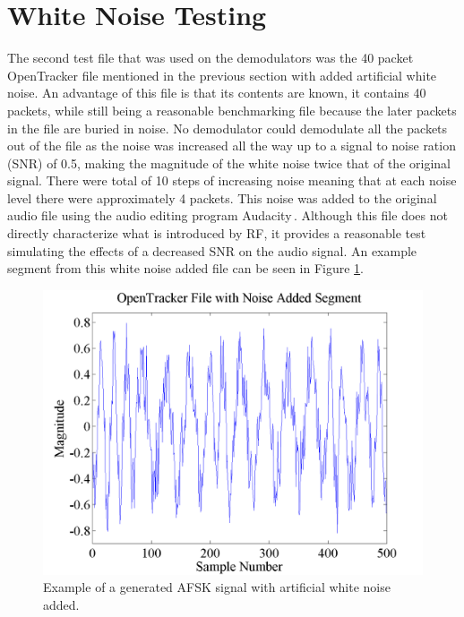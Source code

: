 \section{White Noise Testing}
The second test file that was used on the demodulators was the 40 packet OpenTracker file mentioned in the previous section with added artificial white noise. An advantage of this file is that its contents are known, it contains 40 packets, while still being a reasonable benchmarking file because the later packets in the file are buried in noise. No demodulator could demodulate all the packets out of the file as the noise was increased all the way up to a signal to noise ration (SNR) of 0.5, making the magnitude of the white noise twice that of the original signal. There were total of 10 steps of increasing noise meaning that at each noise level there were approximately 4 packets. This noise was added to the original audio file using the audio editing program Audacity\,\cite{Mazzoni}. Although this file does not directly characterize what is introduced by RF, it provides a reasonable test simulating the effects of a decreased SNR on the audio signal. An example segment from this white noise added file can be seen in Figure \ref{OT3TestwNoiseSegment}.
\begin{figure}
  \centering
	\includegraphics[width=0.75\linewidth]{images/OpenTrackerFilewithNoiseAddedSegment.png} 
	\caption{Example of a generated AFSK signal with artificial white noise added.}
   \label{OT3TestwNoiseSegment}
\end{figure}
 
